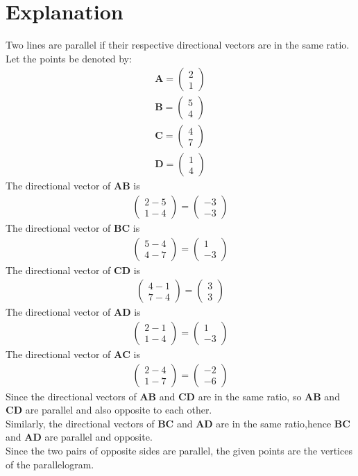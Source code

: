 \documentclass[journal,12pt,twocolumn]{IEEEtran}
\newcommand{\myvec}[1]{\ensuremath{\begin{pmatrix}#1\end{pmatrix}}}
\numberwithin{equation}{subsection}
\let\vec\mathbf
\begin{document}
\section{Explanation}
Two lines are parallel if their respective directional vectors are in the same ratio.\\
Let the points be denoted by:
 \begin{align}
     \vec{A}= \myvec{2 \\1}\\
     \vec{B}= \myvec{5 \\4}\\
     \vec{C}=\myvec{4 \\7}\\
      \vec{D}=\myvec{1 \\4 }
 \end{align}
 The directional vector of $\vec{AB}$ is
\begin{align}
\myvec{2-5\\1-4}=\myvec{-3 \\-3}
\end{align}
The directional vector of $\vec{BC}$ is
\begin{align}
\myvec{5-4\\4-7}=\myvec{1 \\-3}
\end{align}
The directional vector of $\vec{CD}$ is
\begin{align}
\myvec{4-1\\7-4}=\myvec{3 \\3}
\end{align}
The directional vector of $\vec{AD}$ is
\begin{align}
\myvec{2-1\\1-4}=\myvec{1 \\-3}
\end{align}
The directional vector of $\vec{AC}$ is
\begin{align}
\myvec{2-4\\1-7}=\myvec{-2 \\-6}
\end{align}
Since the directional vectors of $\vec{AB}$ and $\vec{CD}$ are in the same ratio, so $\vec{AB}$ and $\vec{CD}$ are parallel and also opposite to each other.\\
Similarly, the directional vectors of $\vec{BC}$ and $\vec{AD}$ are in the same ratio,hence $\vec{BC}$ and $\vec{AD}$ are parallel and opposite.\\ 
Since the two pairs of opposite sides are parallel, the given points are the vertices of the parallelogram.\\
\end{document}
